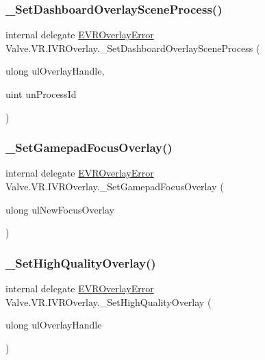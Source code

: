 \subsubsection{\texorpdfstring{\_SetDashboardOverlaySceneProcess()}{\_SetDashboardOverlaySceneProcess()}}
{\footnotesize\ttfamily internal delegate \mbox{\hyperlink{namespace_valve_1_1_v_r_aaee5c5144f42b7969d45b854f51b0c18}{E\+V\+R\+Overlay\+Error}} Valve.\+V\+R.\+I\+V\+R\+Overlay.\+\_\+\+Set\+Dashboard\+Overlay\+Scene\+Process (\begin{DoxyParamCaption}\item[{ulong}]{ul\+Overlay\+Handle,  }\item[{uint}]{un\+Process\+Id }\end{DoxyParamCaption})}

\mbox{\label{struct_valve_1_1_v_r_1_1_i_v_r_overlay_a52e2a2a1d78d2bc21361fee22beb6b65}} 
\subsubsection{\texorpdfstring{\_SetGamepadFocusOverlay()}{\_SetGamepadFocusOverlay()}}
{\footnotesize\ttfamily internal delegate \mbox{\hyperlink{namespace_valve_1_1_v_r_aaee5c5144f42b7969d45b854f51b0c18}{E\+V\+R\+Overlay\+Error}} Valve.\+V\+R.\+I\+V\+R\+Overlay.\+\_\+\+Set\+Gamepad\+Focus\+Overlay (\begin{DoxyParamCaption}\item[{ulong}]{ul\+New\+Focus\+Overlay }\end{DoxyParamCaption})}

\mbox{\label{struct_valve_1_1_v_r_1_1_i_v_r_overlay_a659761a1e6723ccc46ed137f72a2421e}} 
\subsubsection{\texorpdfstring{\_SetHighQualityOverlay()}{\_SetHighQualityOverlay()}}
{\footnotesize\ttfamily internal delegate \mbox{\hyperlink{namespace_valve_1_1_v_r_aaee5c5144f42b7969d45b854f51b0c18}{E\+V\+R\+Overlay\+Error}} Valve.\+V\+R.\+I\+V\+R\+Overlay.\+\_\+\+Set\+High\+Quality\+Overlay (\begin{DoxyParamCaption}\item[{ulong}]{ul\+Overlay\+Handle }\end{DoxyParamCaption})}

